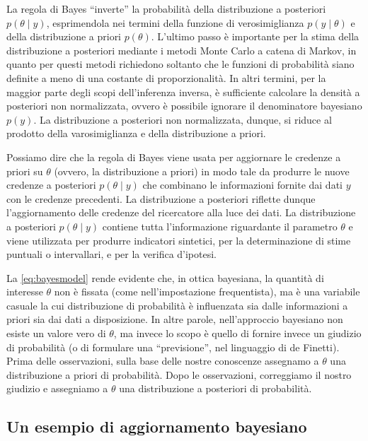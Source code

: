 \documentclass[
  11pt,
]{krantz}
\theoremstyle{definition}
\theoremstyle{definition}
\theoremstyle{definition}
\theoremstyle{definition}
\theoremstyle{remark}
\begin{document}
La regola di Bayes ``inverte'' la probabilità della distribuzione a posteriori \(p(\theta \mid y)\), esprimendola nei termini della funzione di verosimiglianza \(p(y \mid \theta)\) e della distribuzione a priori \(p(\theta)\). L'ultimo passo è importante per la stima della distribuzione a posteriori mediante i metodi Monte Carlo a catena di Markov, in quanto per questi metodi richiedono soltanto che le funzioni di probabilità siano definite a meno di una costante di proporzionalità. In altri termini, per la maggior parte degli scopi dell'inferenza inversa, è sufficiente calcolare la densità a posteriori non normalizzata, ovvero è possibile ignorare il denominatore bayesiano \(p(y)\). La distribuzione a posteriori non normalizzata, dunque, si riduce al prodotto della varosimiglianza e della distribuzione a priori.

Possiamo dire che la regola di Bayes viene usata per aggiornare le credenze a priori su \(\theta\) (ovvero, la distribuzione a priori) in modo tale da produrre le nuove credenze a posteriori \(p(\theta \mid y)\) che combinano le informazioni fornite dai dati \(y\) con le credenze precedenti. La distribuzione a posteriori riflette dunque l'aggiornamento delle credenze del ricercatore alla luce dei dati. La distribuzione a posteriori \(p(\theta \mid y)\) contiene tutta l'informazione riguardante il parametro \(\theta\) e viene utilizzata per produrre indicatori sintetici, per la determinazione di stime puntuali o intervallari, e per la verifica d'ipotesi.

La \eqref{eq:bayesmodel} rende evidente che, in ottica bayesiana, la quantità di interesse \(\theta\) non è fissata (come nell'impostazione frequentista), ma è una variabile casuale la cui distribuzione di probabilità è influenzata sia dalle informazioni a priori sia dai dati a disposizione. In altre parole, nell'approccio bayesiano non esiste un valore vero di \(\theta\), ma invece lo scopo è quello di fornire invece un giudizio di probabilità (o di formulare una ``previsione'', nel linguaggio di de Finetti). Prima delle osservazioni, sulla base delle nostre conoscenze assegnamo a \(\theta\) una distribuzione a priori di probabilità. Dopo le osservazioni, correggiamo il nostro giudizio e assegniamo a \(\theta\) una distribuzione a posteriori di probabilità.

\hypertarget{un-esempio-di-aggiornamento-bayesiano}{%
\subsection{Un esempio di aggiornamento bayesiano}\label{un-esempio-di-aggiornamento-bayesiano}}
\end{document}
